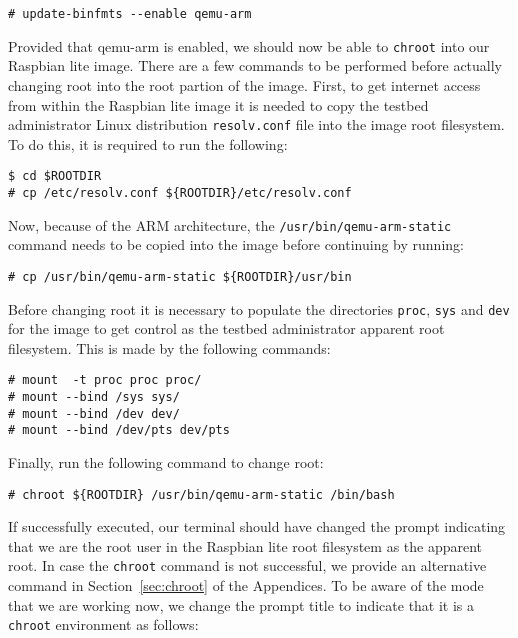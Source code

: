 \begin{lstlisting}[]
# update-binfmts --enable qemu-arm
\end{lstlisting}
\FloatBarrier
\vspace{-5mm}

Provided that qemu-arm is enabled, we should now be able to \texttt{chroot}
into our Raspbian lite image. There are a few commands to be
performed before actually changing root into the root partion of the image.
First, to get internet access from within the Raspbian lite image it is needed
to copy the testbed administrator Linux distribution \texttt{resolv.conf} file
into the image root filesystem. To do this, it is required to run the
following:

\begin{lstlisting}[]
$ cd $ROOTDIR
# cp /etc/resolv.conf ${ROOTDIR}/etc/resolv.conf
\end{lstlisting}
\FloatBarrier
\vspace{-5mm}

Now, because of the \ac{ARM} architecture, the
\texttt{/usr/bin/qemu-arm-static} command needs to be copied into the
image before continuing by running:

\begin{lstlisting}[]
# cp /usr/bin/qemu-arm-static ${ROOTDIR}/usr/bin
\end{lstlisting}
\FloatBarrier
\vspace{-5mm}

Before changing root it is necessary to populate the directories
\texttt{proc}, \texttt{sys} and \texttt{dev} for the image to get control
as the testbed administrator apparent root filesystem. This is made by the
following commands:

\begin{lstlisting}[]
# mount  -t proc proc proc/
# mount --bind /sys sys/
# mount --bind /dev dev/
# mount --bind /dev/pts dev/pts
\end{lstlisting}
\FloatBarrier
\vspace{-5mm}

Finally, run the following command to change root:

\begin{lstlisting}[]
# chroot ${ROOTDIR} /usr/bin/qemu-arm-static /bin/bash
\end{lstlisting}
\FloatBarrier
\vspace{-5mm}

If successfully executed, our terminal should have changed the prompt
indicating that we are the root user in the Raspbian lite root filesystem as
the apparent root. In case the \texttt{chroot} command is not successful,
we provide an alternative command in Section~\ref{sec:chroot} of the Appendices.
To be aware of the mode that we are working now, we change
the prompt title to indicate that it is a \texttt{chroot} environment as
follows:

